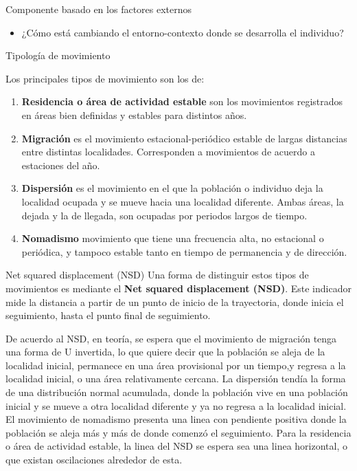 \documentclass[11pt]{beamer}
\begin{document}
\begin{frame}{Componente basado en los factores externos}
	\begin{itemize}
		\item ¿Cómo está cambiando el entorno-contexto donde se desarrolla el individuo?
	\end{itemize}
\end{frame}

\begin{frame}{Tipología de movimiento}

Los principales tipos de movimiento son los de:
	
	\begin{enumerate}
		\item \textbf{Residencia o área de actividad estable} son los movimientos registrados en áreas bien definidas y estables para distintos años. 
		\item \textbf{Migración} es el movimiento estacional-periódico estable de largas distancias entre distintas localidades. Corresponden a movimientos de acuerdo a estaciones del año.
		\item \textbf{Dispersión} es el movimiento en el que la población o individuo deja la localidad ocupada y se mueve hacia una localidad diferente. Ambas áreas, la dejada y la de llegada, son ocupadas por periodos largos de tiempo.
		\item \textbf{Nomadismo} movimiento que tiene una frecuencia alta, no estacional o periódica, y tampoco estable tanto en tiempo de permanencia y de dirección.  
	\end{enumerate}
\end{frame}

\begin{frame}{Net squared displacement (NSD)}
Una forma de distinguir estos tipos de movimientos es mediante el \textbf{Net squared displacement (NSD)}. Este indicador mide la distancia a partir de un punto de inicio de la trayectoria, donde inicia el seguimiento, hasta el punto final de seguimiento.

De acuerdo al NSD, en teoría, se espera que el movimiento de migración tenga una forma de U invertida, lo que quiere decir que la población se aleja de la localidad inicial, permanece en una área provisional por un tiempo,y regresa a la localidad inicial, o una área relativamente cercana. La dispersión tendía la forma de una distribución normal acumulada, donde la población vive en una población inicial y se mueve a otra localidad diferente y ya no regresa a la localidad inicial. El movimiento de nomadismo presenta una linea con pendiente positiva donde la población se aleja más y más de donde comenzó el seguimiento. Para la residencia o área de actividad estable, la linea del NSD se espera sea una linea horizontal, o que existan oscilaciones alrededor de esta.
\end{frame}
\end{document}
